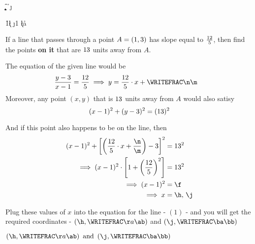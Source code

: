 



\FRACMULT\vc\vd{}\p\q
\FRACMINUS{}\p\q\n\m
\SQUARE\vd\a
\SQUARE\ve\b
\SQUARE\vc\c
\MULTIPLY\a\b\d
\ADD\a\c\e
\DIVIDE\d\e\f
\SQUAREROOT\f\g
\SUBTRACT\va\g\h
\ADD\va\g\j

\FRACMULT\vc\vd\h{1}\k\l
\FRACMULT\vc\vd\j{1}\y\z
\FRACADD\k\l\n\m\aa\ab
\FRACADD\y\z\n\m\ba\bb

\renewcommand{\vf}{\dfrac{\vc}{\vd}}

\question[4] If a line that passes through a point $A = (1, 3)$ has slope equal to $\frac{12}{5}$, 
then find the points \textbf{on it} that are $13$ units away from $A$.

\watchout

\ifprintanswers
\fi 

\begin{solution}[\halfpage]
	The equation of the given line would be 
	\begin{align}
		\dfrac{y-\vb}{x-\va} &= \vf \implies y = \dfrac\vc\vd\cdot x + \WRITEFRAC\n\m
	\end{align}
	Moreover, any point  $(x,y)$ that is $13$ units away from $A$ would also satisy 
    \[ (x - 1)^2 + (y-3)^2 = (13)^2  \]

	And if this point also happens to be on the line, then 
	\begin{align}
		(x-\va)^2 + \left[ \left( \vf\cdot x + \dfrac\n\m\right) - \vb \right]^2 &= \ve^2 \\
		\implies (x - \va)^2\cdot\left[ 1 + \left( \vf \right)^2\right] &= \ve^2 \\
    \implies (x - \va)^2 &= \f  \\ 
    \implies x &=  \h,\,\j
	\end{align}
	
    
  Plug these values of $x$ into the equation for the line - $(1)$ - and you will 
  get the required coordinates -  $(\h,\WRITEFRAC\aa\ab)$ and $(\j,\WRITEFRAC\ba\bb)$
\end{solution}

\ifprintanswers
  \begin{codex}
    $\left(\h,\WRITEFRAC\aa\ab\right)\text{ and }\left(\j,\WRITEFRAC\ba\bb\right)$
  \end{codex}
\fi
